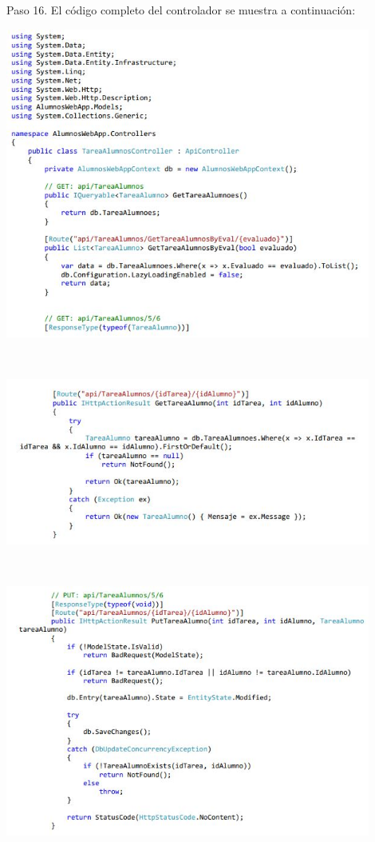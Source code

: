 \begin{flushleft}
\begin{itemize}
Paso 16. El código completo del controlador se muestra a continuación: 

\begin{center}
	\includegraphics[width=12cm]{./Imagenes/paso16} 
	\end{center}

\textbf{ }\\

\begin{center}
	\includegraphics[width=12cm]{./Imagenes/paso16-1} 
	\end{center}

\textbf{ }\\

\begin{center}
	\includegraphics[width=12cm]{./Imagenes/paso16-2} 
	\end{center}


\end{itemize}
\end{flushleft}

